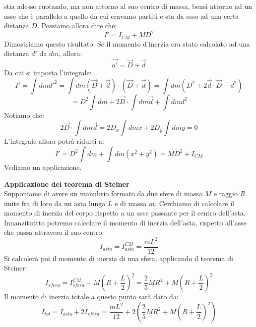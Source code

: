 \documentclass[a4paper,12pt]{article}
\begin{document}
stia adesso ruotando, ma non attorno al suo centro di massa, bensì attorno ad un asse che è parallelo a quello da cui eravamo partiti e sta
da esso ad una certa distanza $D$. Possiamo allora dire che:
$$ I' = I_{CM} + MD^2$$
Dimostriamo questo risultato. Se il momento d'inerzia era stato calcolato ad una distanza $d'$ da $dm$, allora:
$$ \vec{a'} = \vec{D} + \vec{d} $$
Da cui si imposta l'integrale:
$$ I' = \int dmd'^2 = \int dm(\vec{D} + \vec{d})\cdot(\vec{D} + \vec{d}) = \int dm(D^2 + 2\vec{d}\cdot\vec{D}+d^2)  $$
$$ = D^2\int dm + 2\vec{D} \cdot \int dm\vec{d} + \int dmd^2$$
Notiamo che:
$$2\vec{D}\cdot\int dm\vec{d} = 2D_x\int dmx + 2D_y\int dm y = 0$$
L'integrale allora potrà ridursi a:
$$ I' = D^2 \int dm + \int dm(x^2+y^2) = MD^2 + I_{CM}$$
Vediamo un applicazione.
\par\smallskip
\textbf{Applicazione del teorema di Steiner} \\
Supponiamo di avere un manubrio formato da due sfere di massa $M$ e raggio $R$ unite fra di loro da un asta lunga $L$ e di massa $m$. Cerchiamo
di calcolare il momento di inerzia del corpo rispetto a un asse passante per il centro dell'asta.
Innanzituttto potremo calcolare il momento di inerzia dell'asta, rispetto all'asse che passa attravero il suo centro:
$$ I_{asta} = I_{asta}^{CM} = \frac{mL^2}{12} $$
Si calcolerà poi il momento di inerzia di una sfera, applicando il teorema di Steiner:
$$ I_{sfera} = I_{sfera}^{CM} + M(R+\frac{L}{2})^2 = \frac{2}{5}MR^2 + M(R+ \frac{L}{2})^2 $$
Il momento di inerzia totale a questo punto sarà dato da:
$$ I_{tot} = I_{asta} + 2I_{sfera} = \frac{mL^2}{12} + 2(\frac{2}{5}MR^2 + M(R+ \frac{L}{2})^2)$$
\end{document}
